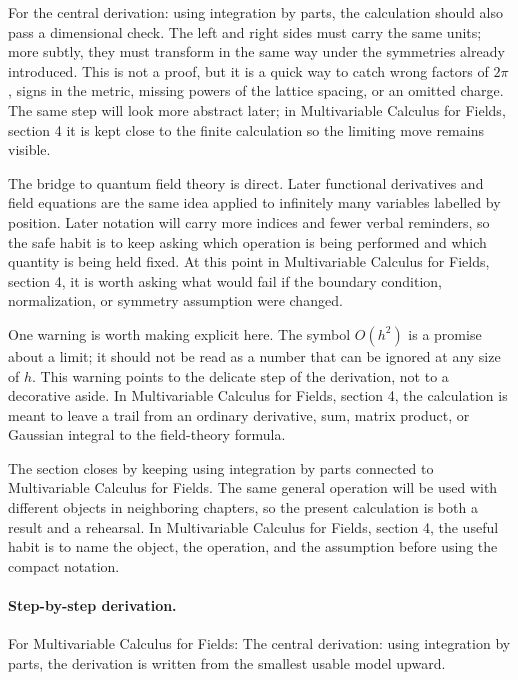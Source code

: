 For the central derivation: using integration by parts, the calculation should also pass a dimensional check.  The left and right sides must carry the same units; more subtly, they must transform in the same way under the symmetries already introduced.  This is not a proof, but it is a quick way to catch wrong factors of \(2\pi\), signs in the metric, missing powers of the lattice spacing, or an omitted charge.  The same step will look more abstract later; in Multivariable Calculus for Fields, section 4 it is kept close to the finite calculation so the limiting move remains visible.

The bridge to quantum field theory is direct.  Later functional derivatives and field equations are the same idea applied to infinitely many variables labelled by position.  Later notation will carry more indices and fewer verbal reminders, so the safe habit is to keep asking which operation is being performed and which quantity is being held fixed.  At this point in Multivariable Calculus for Fields, section 4, it is worth asking what would fail if the boundary condition, normalization, or symmetry assumption were changed.

One warning is worth making explicit here.  The symbol \(O(h^2)\) is a promise about a limit; it should not be read as a number that can be ignored at any size of \(h\).  This warning points to the delicate step of the derivation, not to a decorative aside.  In Multivariable Calculus for Fields, section 4, the calculation is meant to leave a trail from an ordinary derivative, sum, matrix product, or Gaussian integral to the field-theory formula.

The section closes by keeping using integration by parts connected to Multivariable Calculus for Fields.  The same general operation will be used with different objects in neighboring chapters, so the present calculation is both a result and a rehearsal.  In Multivariable Calculus for Fields, section 4, the useful habit is to name the object, the operation, and the assumption before using the compact notation.



\paragraph{Step-by-step derivation.}

For Multivariable Calculus for Fields: The central derivation: using integration by parts, the derivation is written from the smallest usable model upward.

